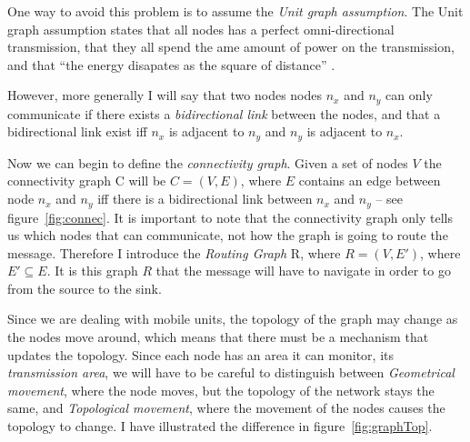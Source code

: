 One way to avoid this problem is to assume the \emph{Unit graph assumption}. The Unit graph assumption states that all nodes has a perfect omni-directional transmission, that they all spend the ame amount of power on the transmission, and that ``the energy disapates as the square of distance'' \cite{practical}.

However, more generally I will say that two nodes nodes $n_x$ and $n_y$ can only communicate if there exists a \emph{bidirectional link} between the nodes, and that a bidirectional link exist iff $n_x$ is adjacent to $n_y$ and $n_y$ is adjacent to $n_x$.


Now we can begin to define the \emph{connectivity graph}. Given a set of nodes $V$ the connectivity graph C will be $C = (V, E)$, where $E$ contains an edge between node $n_x$ and $n_y$ iff there is a bidirectional link between $n_x$ and $n_y$ -- see figure~\ref{fig:connec}. It is important to note that the connectivity graph only tells us which nodes that can communicate, not how the graph is going to route the message. Therefore I introduce the \emph{Routing Graph} R, where $R = (V, E\prime)$, where $E\prime \subseteq E$. It is this graph $R$ that the message will have to navigate in order to go from the source to the sink.


Since we are dealing with mobile units, the topology of the graph may change as the nodes move around, which means that there must be a mechanism that updates the topology. Since each node has an area it can monitor, its \emph{transmission area}, we will have to be careful to distinguish between \emph{Geometrical movement}, where the node moves, but the topology of the network stays the same, and \emph{Topological movement}, where the movement of the nodes causes the topology to change. I have illustrated the difference in figure~\ref{fig:graphTop}. 

